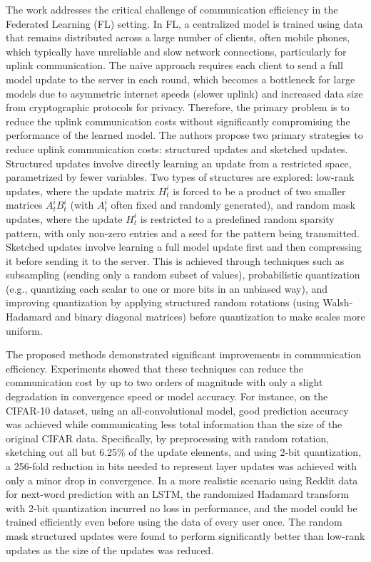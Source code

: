 The work \cite{konevcny2016federated} addresses the critical challenge of communication efficiency in the Federated Learning (FL) setting. In FL, a centralized model is trained using data that remains distributed across a large number of clients, often mobile phones, which typically have unreliable and slow network connections, particularly for uplink communication. The naive approach requires each client to send a full model update to the server in each round, which becomes a bottleneck for large models due to asymmetric internet speeds (slower uplink) and increased data size from cryptographic protocols for privacy. Therefore, the primary problem is to reduce the uplink communication costs without significantly compromising the performance of the learned model. The authors propose two primary strategies to reduce uplink communication costs: structured updates and sketched updates. Structured updates involve directly learning an update from a restricted space, parametrized by fewer variables. Two types of structures are explored: low-rank updates, where the update matrix $H_t^i$ is forced to be a product of two smaller matrices $A_t^i B_t^i$ (with $A_t^i$ often fixed and randomly generated), and random mask updates, where the update $H_t^i$ is restricted to a predefined random sparsity pattern, with only non-zero entries and a seed for the pattern being transmitted. Sketched updates involve learning a full model update first and then compressing it before sending it to the server. This is achieved through techniques such as subsampling (sending only a random subset of values), probabilistic quantization (e.g., quantizing each scalar to one or more bits in an unbiased way), and improving quantization by applying structured random rotations (using Walsh-Hadamard and binary diagonal matrices) before quantization to make scales more uniform. 

The proposed methods demonstrated significant improvements in communication efficiency. Experiments showed that these techniques can reduce the communication cost by up to two orders of magnitude with only a slight degradation in convergence speed or model accuracy. For instance, on the CIFAR-10 dataset, using an all-convolutional model, good prediction accuracy was achieved while communicating less total information than the size of the original CIFAR data. Specifically, by preprocessing with random rotation, sketching out all but 6.25\% of the update elements, and using 2-bit quantization, a 256-fold reduction in bits needed to represent layer updates was achieved with only a minor drop in convergence. In a more realistic scenario using Reddit data for next-word prediction with an LSTM, the randomized Hadamard transform with 2-bit quantization incurred no loss in performance, and the model could be trained efficiently even before using the data of every user once. The random mask structured updates were found to perform significantly better than low-rank updates as the size of the updates was reduced. 


